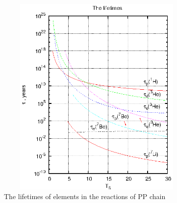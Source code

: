 \documentclass[12pt,a4paper,titlepage]{jarticle}
\begin{document}
\title{}
\author{A4SB2121　遊佐秀作}
\date{}

\begin{figure}[h]
\begin{center}
\includegraphics[width=100mm,height=100mm]{pp_chain_lifetimes.eps}
\caption{The lifetimes of elements in the reactions of PP chain}
\end{center}
\end{figure}
\end{document}
